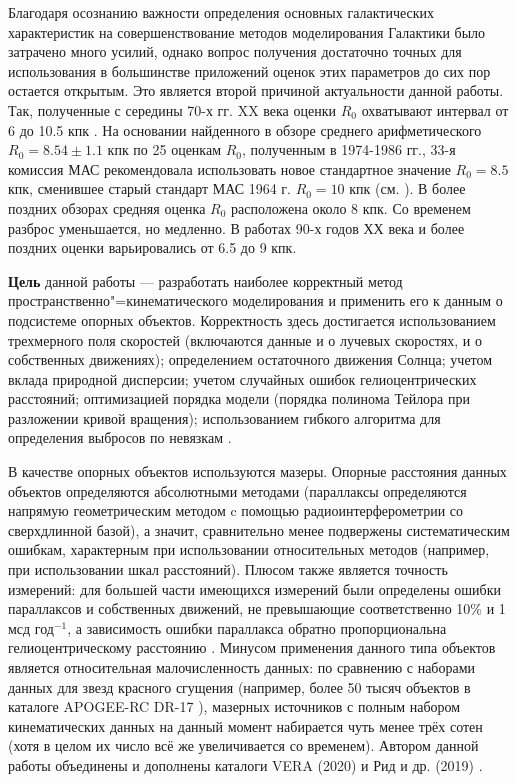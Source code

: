 \documentclass[a4paper, oneside, 14pt]{article}
\begin{document}
Благодаря осознанию важности определения основных галактических характеристик на совершенствование методов моделирования Галактики было затрачено много усилий, однако вопрос получения достаточно точных для использования в большинстве приложений оценок этих параметров до сих пор остается открытым. Это является второй причиной актуальности данной работы. Так, полученные с середины 70-х гг. XX века оценки $ R_0 $ охватывают интервал от 6 до 10.5 кпк \cite{K.L.1986, F.1987, R.1993}. На основании найденного в обзоре \cite{K.L.1986} среднего арифметического $ R_0 = 8.54 \pm 1.1 $ кпк по 25 оценкам $ R_0 $, полученным в 1974-1986 гг., 33-я комиссия МАС рекомендовала использовать новое стандартное значение $ R_0 = 8.5 $ кпк, сменившее старый стандарт МАС 1964 г. $ R_0 = 10 $ кпк (см. \cite{F.T.1991}). В более поздних обзорах \cite{R.1993, N.2004} средняя оценка $ R_0 $ расположена около 8 кпк. Со временем разброс уменьшается, но медленно. В работах 90-х годов ХХ века и более поздних оценки варьировались от 6.5 до 9 кпк.

\textbf{Цель} данной работы --- разработать наиболее корректный метод пространственно"=кинематического моделирования и применить его к данным о подсистеме опорных объектов. Корректность здесь достигается использованием трехмерного поля скоростей (включаются данные и о лучевых скоростях, и о собственных движениях); определением остаточного движения Солнца; учетом вклада природной дисперсии; учетом случайных ошибок гелиоцентрических расстояний; оптимизацией порядка модели (порядка полинома Тейлора при разложении кривой вращения); использованием гибкого алгоритма для определения выбросов по невязкам \cite{N.2012}.

В качестве опорных объектов используются мазеры. Опорные расстояния данных объектов определяются абсолютными методами (параллаксы определяются напрямую геометрическим методом c помощью радиоинтерферометрии со сверхдлинной базой), а значит, сравнительно менее подвержены систематическим ошибкам, характерным при использовании относительных методов (например, при использовании шкал расстояний). Плюсом также является точность измерений: для большей части имеющихся измерений были определены ошибки параллаксов и собственных движений, не превышающие соответственно 10\% и 1 мсд год$^{-1}$, а зависимость ошибки параллакса обратно пропорциональна гелиоцентрическому расстоянию \cite{N.V.2018}. Минусом применения данного типа объектов является относительная малочисленность данных: по сравнению с наборами данных для звезд красного сгущения \cite{V.2019} (например, более 50 тысяч объектов в каталоге APOGEE-RC DR-17 \cite{DR17-APOGEE}), мазерных источников с полным набором кинематических данных на данный момент набирается чуть менее трёх сотен (хотя в целом их число всё же увеличивается со временем). Автором данной работы объединены и дополнены каталоги VERA (2020) \cite{VERA.2020} и Рид и др. (2019) \cite{R.2019}.
\end{document}

